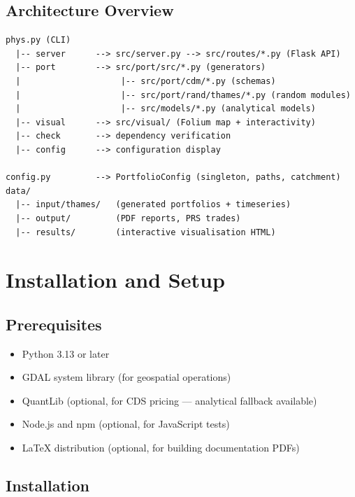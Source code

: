 \documentclass[11pt,a4paper]{article}
\begin{document}
\subsection{Architecture Overview}

\begin{lstlisting}[language={},caption={Platform architecture}]
phys.py (CLI)
  |-- server      --> src/server.py --> src/routes/*.py (Flask API)
  |-- port        --> src/port/src/*.py (generators)
  |                    |-- src/port/cdm/*.py (schemas)
  |                    |-- src/port/rand/thames/*.py (random modules)
  |                    |-- src/models/*.py (analytical models)
  |-- visual      --> src/visual/ (Folium map + interactivity)
  |-- check       --> dependency verification
  |-- config      --> configuration display

config.py         --> PortfolioConfig (singleton, paths, catchment)
data/
  |-- input/thames/   (generated portfolios + timeseries)
  |-- output/         (PDF reports, PRS trades)
  |-- results/        (interactive visualisation HTML)
\end{lstlisting}

\section{Installation and Setup}

\subsection{Prerequisites}

\begin{itemize}[nosep]
    \item Python 3.13 or later
    \item GDAL system library (for geospatial operations)
    \item QuantLib (optional, for CDS pricing --- analytical fallback available)
    \item Node.js and npm (optional, for JavaScript tests)
    \item \LaTeX{} distribution (optional, for building documentation PDFs)
\end{itemize}

\subsection{Installation}
\end{document}
